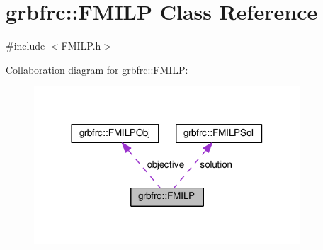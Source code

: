 \hypertarget{classgrbfrc_1_1FMILP}{}\section{grbfrc\+:\+:F\+M\+I\+LP Class Reference}
\label{classgrbfrc_1_1FMILP}


{\ttfamily \#include $<$F\+M\+I\+L\+P.\+h$>$}



Collaboration diagram for grbfrc\+:\+:F\+M\+I\+LP\+:
\nopagebreak
\begin{figure}[H]
\begin{center}
\leavevmode
\includegraphics[width=282pt]{classgrbfrc_1_1FMILP__coll__graph}
\end{center}
\end{figure}
